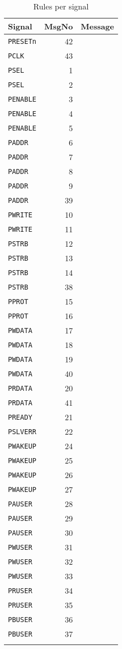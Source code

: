 \begin{longtable}[]{@{}lrl@{}}
\toprule
\textbf{Signal} & \textbf{MsgNo} & \textbf{Message}\tabularnewline
\midrule
\endhead
\texttt{PRESETn} & 42 & \nameref{subsec:APB-42}\tabularnewline
\texttt{PCLK}    & 43 & \nameref{subsec:APB-43}\tabularnewline
\texttt{PSEL}    &  1 & \nameref{subsec:APB-1} \tabularnewline
\texttt{PSEL}    &  2 & \nameref{subsec:APB-2} \tabularnewline
\texttt{PENABLE} &  3 & \nameref{subsec:APB-3} \tabularnewline
\texttt{PENABLE} &  4 & \nameref{subsec:APB-4} \tabularnewline
\texttt{PENABLE} &  5 & \nameref{subsec:APB-5} \tabularnewline
\texttt{PADDR}   &  6 & \nameref{subsec:APB-6} \tabularnewline
\texttt{PADDR}   &  7 & \nameref{subsec:APB-7} \tabularnewline
\texttt{PADDR}   &  8 & \nameref{subsec:APB-8} \tabularnewline
\texttt{PADDR}   &  9 & \nameref{subsec:APB-9} \tabularnewline
\texttt{PADDR}   & 39 & \nameref{subsec:APB-39}\tabularnewline
\texttt{PWRITE}  & 10 & \nameref{subsec:APB-10}\tabularnewline
\texttt{PWRITE}  & 11 & \nameref{subsec:APB-11}\tabularnewline
\texttt{PSTRB}   & 12 & \nameref{subsec:APB-12}\tabularnewline
\texttt{PSTRB}   & 13 & \nameref{subsec:APB-13}\tabularnewline
\texttt{PSTRB}   & 14 & \nameref{subsec:APB-14}\tabularnewline
\texttt{PSTRB}   & 38 & \nameref{subsec:APB-38}\tabularnewline
\texttt{PPROT}   & 15 & \nameref{subsec:APB-15}\tabularnewline
\texttt{PPROT}   & 16 & \nameref{subsec:APB-16}\tabularnewline
\texttt{PWDATA}  & 17 & \nameref{subsec:APB-17}\tabularnewline
\texttt{PWDATA}  & 18 & \nameref{subsec:APB-18}\tabularnewline
\texttt{PWDATA}  & 19 & \nameref{subsec:APB-19}\tabularnewline
\texttt{PWDATA}  & 40 & \nameref{subsec:APB-40}\tabularnewline
\texttt{PRDATA}  & 20 & \nameref{subsec:APB-20}\tabularnewline
\texttt{PRDATA}  & 41 & \nameref{subsec:APB-41}\tabularnewline
\texttt{PREADY}  & 21 & \nameref{subsec:APB-21}\tabularnewline
\texttt{PSLVERR} & 22 & \nameref{subsec:APB-22}\tabularnewline
\texttt{PWAKEUP} & 24 & \nameref{subsec:APB-24}\tabularnewline
\texttt{PWAKEUP} & 25 & \nameref{subsec:APB-25}\tabularnewline
\texttt{PWAKEUP} & 26 & \nameref{subsec:APB-26}\tabularnewline
\texttt{PWAKEUP} & 27 & \nameref{subsec:APB-27}\tabularnewline
\texttt{PAUSER}  & 28 & \nameref{subsec:APB-28}\tabularnewline
\texttt{PAUSER}  & 29 & \nameref{subsec:APB-29}\tabularnewline
\texttt{PAUSER}  & 30 & \nameref{subsec:APB-30}\tabularnewline
\texttt{PWUSER}  & 31 & \nameref{subsec:APB-31}\tabularnewline
\texttt{PWUSER}  & 32 & \nameref{subsec:APB-32}\tabularnewline
\texttt{PWUSER}  & 33 & \nameref{subsec:APB-33}\tabularnewline
\texttt{PRUSER}  & 34 & \nameref{subsec:APB-34}\tabularnewline
\texttt{PRUSER}  & 35 & \nameref{subsec:APB-35}\tabularnewline
\texttt{PBUSER}  & 36 & \nameref{subsec:APB-36}\tabularnewline
\texttt{PBUSER}  & 37 & \nameref{subsec:APB-37}\tabularnewline
\bottomrule
\caption{Rules per signal}
\end{longtable}
